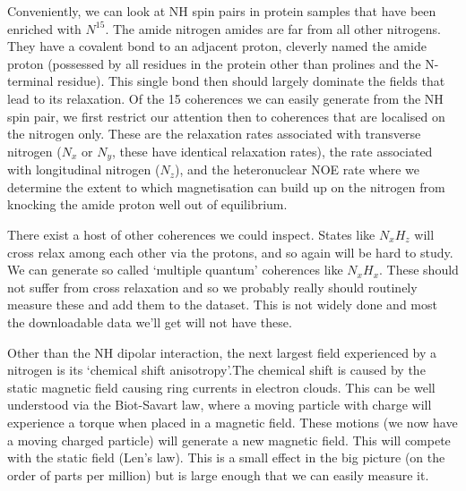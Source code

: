 \documentclass[showkeys,aps,prb,prepreint,amssymb, amsmath,nobibnotes]{article}
\begin{document}
  Conveniently, we can look at NH spin pairs in protein samples that have been enriched with $N^{15}$. The amide nitrogen amides are far from all other nitrogens. They have a covalent bond to an adjacent proton, cleverly named the amide proton (possessed by all residues in the protein other than prolines and the N-terminal residue). This single bond then should largely dominate the fields that lead to its relaxation. Of the 15 coherences we can easily generate from the NH spin pair, we first restrict our attention then to coherences that are localised on the nitrogen only. These are the relaxation rates associated with transverse nitrogen ($N_x$ or $N_y$, these have identical relaxation rates), the rate associated with longitudinal nitrogen ($N_z$), and the heteronuclear NOE rate where we determine the extent to which magnetisation can build up on the nitrogen from knocking the amide proton well out of equilibrium.

  There exist a host of other coherences we could inspect. States like $N_xH_z$ will cross relax among each other via the protons, and so again will be hard to study. We can generate so called `multiple quantum' coherences like $N_xH_x$. These should not suffer from cross relaxation and so we probably really should routinely measure these and add them to the dataset. This is not widely done and most the downloadable data we'll get will not have these.

  Other than the NH dipolar interaction, the next largest field experienced by a nitrogen is its `chemical shift anisotropy'.The chemical shift is caused by the static magnetic field causing ring currents in electron clouds. This can be well understood via the Biot-Savart law, where a moving particle with charge will experience a torque when placed in a magnetic field. These motions (we now have a moving charged particle) will generate a new magnetic field. This will compete with the static field (Len's law). This is a small effect in the big picture (on the order of parts per million) but is large enough that we can easily measure it.
\end{document}
